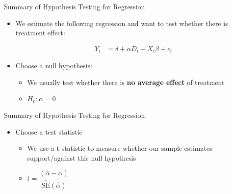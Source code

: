 \documentclass[dvipsnames,hyperref={pdfpagelabels=false}]{beamer}
\begin{document}





\date
{}


\begin{frame}{}
	\titlepage
\end{frame}





\begin{frame}{Summary of Hypothesis Testing for Regression}
\begin{itemize} 
\item We estimate the following regression and want to test whether there is treatment effect:

\begin{align*}
	Y_i &= \delta + \alpha D_i + X_{i} \beta  + \epsilon_{i}
	\end{align*}
	
\item[1.] Choose a null hypothesis:
	\begin{itemize} 
					\vspace{0.3cm}
	\item We usually test whether there is \textbf{no average effect} of treatment	
	\vspace{0.3cm}
	\item $H_0: \alpha = 0$ 
		\vspace{0.3cm}
	

	\end{itemize}


	
	
	
	

\end{itemize}
\end{frame}







\begin{frame}{Summary of Hypothesis Testing for Regression}
	\begin{itemize} 
	
		
		\item[2.] Choose a test statistic
		\begin{itemize} 
			\vspace{0.3cm}
			\item We use a t-statistic to measure whether our sample estimates support/against this null hypothesis
			
			\vspace{0.3cm}
			\item $t = \dfrac{(\hat{\alpha}-\alpha)}{\hat{\mathrm{SE}}(\hat{\alpha})}$
		\end{itemize}
		
		
		
		
		
	\end{itemize}
\end{frame}
\end{document}
